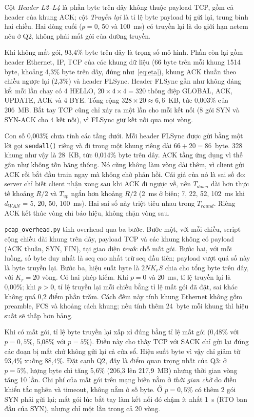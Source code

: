 Cột \emph{Header L2--L4} là phần byte trên dây không thuộc payload TCP, gồm cả header của khung ACK; cột \emph{Truyền lại} là tỉ lệ byte payload bị gửi lại, trung bình hai chiều. Hai dòng cuối ($p = 0$, 50 và 100~ms) có truyền lại là do giới hạn netem nêu ở Q2, không phải mất gói của đường truyền.

Khi không mất gói, 93{,}4\% byte trên dây là trọng số mô hình. Phần còn lại gồm header Ethernet, IP, TCP của các khung dữ liệu (66 byte trên mỗi khung 1514 byte, khoảng 4{,}3\% byte trên dây, đúng như~\eqref{eq:eta}), khung ACK thuần theo chiều ngược lại (2{,}3\%) và header FLSync. Header FLSync gần như không đáng kể: mỗi lần chạy có 4 HELLO, $20 \times 4 \times 4 = 320$ thông điệp GLOBAL, ACK, UPDATE, ACK và 4 BYE. Tổng cộng $328 \times 20 \approx 6{,}6$~KB, tức 0{,}003\% của 206~MB. Bắt tay TCP cũng chỉ xảy ra một lần cho mỗi kết nối (8 gói SYN và SYN-ACK cho 4 kết nối), vì FLSync giữ kết nối qua mọi vòng.

Con số 0{,}003\% chưa tính các tầng dưới. Mỗi header FLSync được gửi bằng một lời gọi \texttt{sendall()} riêng và đi trong một khung riêng dài $66 + 20 = 86$~byte. 328 khung như vậy là 28~KB, tức 0{,}014\% byte trên dây. ACK tầng ứng dụng vì thế gần như không tốn băng thông. Nó cũng không làm vòng dài thêm, vì client gửi ACK rồi bắt đầu train ngay mà không chờ phản hồi. Cái giá của nó là sai số đo: server chỉ biết client nhận xong sau khi ACK đi ngược về, nên $T_{down}$ dài hơn thực tế khoảng $R/2$ và $T_{up}$ ngắn hơn khoảng $R/2$ (2~ms ở biên; 7, 22, 52, 102~ms khi $d_{WAN}$ = 5, 20, 50, 100~ms). Hai sai số này triệt tiêu nhau trong $T_{round}$. Riêng ACK kết thúc vòng chỉ báo hiệu, không chặn vòng sau.

\texttt{pcap\_overhead.py} tính overhead qua ba bước. Bước một, với mỗi chiều, script cộng chiều dài khung trên dây, payload TCP và các khung không có payload (ACK thuần, SYN, FIN), tại giao diện \emph{trước} chỗ mất gói. Bước hai, với mỗi luồng, số byte duy nhất là seq cao nhất trừ seq đầu tiên; payload vượt quá số này là byte truyền lại. Bước ba, hiệu suất byte là $2 N K_r S$ chia cho tổng byte trên dây, với $K_r = 20$ vòng. Có hai phép kiểm. Khi $p = 0$ và 20~ms, tỉ lệ truyền lại là 0{,}00\%; khi $p > 0$, tỉ lệ truyền lại mỗi chiều bằng tỉ lệ mất gói đã đặt, sai khác không quá 0{,}2 điểm phần trăm. Cách đếm này tính khung Ethernet không gồm preamble, FCS và khoảng cách khung; nếu tính thêm 24~byte mỗi khung thì hiệu suất sẽ thấp hơn bảng.

Khi có mất gói, tỉ lệ byte truyền lại xấp xỉ đúng bằng tỉ lệ mất gói (0{,}48\% với $p = 0{,}5\%$, 5{,}08\% với $p = 5\%$). Điều này cho thấy TCP với SACK chỉ gửi lại đúng các đoạn bị mất chứ không gửi lại cả cửa sổ. Hiệu suất byte vì vậy chỉ giảm từ 93{,}4\% xuống 88{,}4\%. Đặt cạnh Q2, đây là điểm quan trọng nhất của Q3: ở $p = 5\%$, lượng byte chỉ tăng 5{,}6\% (206{,}3 lên 217{,}9~MB) nhưng thời gian vòng tăng 10 lần. Chi phí của mất gói trên mạng biên nằm ở \emph{thời gian chờ} do điều khiển tắc nghẽn và timeout, không nằm ở số byte. Ở $p = 0{,}5\%$ có thêm 2 gói SYN phải gửi lại; mất gói lúc bắt tay làm kết nối đó chậm ít nhất 1~s (RTO ban đầu của SYN), nhưng chỉ một lần trong cả 20 vòng.

